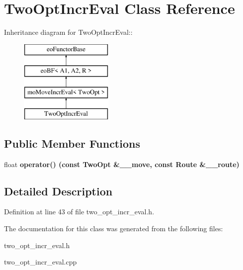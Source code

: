 \section{Two\-Opt\-Incr\-Eval Class Reference}
\label{class_two_opt_incr_eval}
Inheritance diagram for Two\-Opt\-Incr\-Eval::\begin{figure}[H]
\begin{center}
\leavevmode
\includegraphics[height=4cm]{class_two_opt_incr_eval}
\end{center}
\end{figure}
\subsection*{Public Member Functions}
\begin{CompactItemize}
\item 
float \bf{operator()} (const \bf{Two\-Opt} \&\_\-\_\-move, const \bf{Route} \&\_\-\_\-route)\label{class_two_opt_incr_eval_4574d0b22065be5b59b88791e2b61138}

\end{CompactItemize}


\subsection{Detailed Description}




Definition at line 43 of file two\_\-opt\_\-incr\_\-eval.h.

The documentation for this class was generated from the following files:\begin{CompactItemize}
\item 
two\_\-opt\_\-incr\_\-eval.h\item 
two\_\-opt\_\-incr\_\-eval.cpp\end{CompactItemize}

